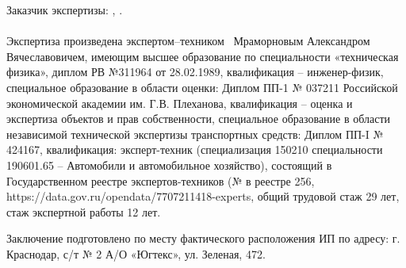 Заказчик  экспертизы:  ,  .



\paragraph*{}
Экспертиза произведена  экспертом--техником
\,  Мраморновым Александром Вячеславовичем, имеющим высшее  образование по специальности «техническая физика», диплом РВ №311964 от 28.02.1989, квалификация -- инженер-физик, специальное образование в области оценки: Диплом ПП-1 № 037211 Российской экономической академии им. Г.В. Плеханова, квалификация -- оценка и экспертиза объектов и прав собственности, специальное образование в области независимой технической экспертизы транспортных средств: Диплом ПП-I № 424167, квалификация: эксперт-техник (специализация 150210 специальности 190601.65 – Автомобили и автомобильное хозяйство), состоящий в Государственном реестре экспертов-техников (№ в реестре 256, https://data.gov.ru/opendata/7707211418-experts,  общий трудовой  стаж 29 лет, стаж  экспертной работы  12 лет. \par Заключение подготовлено по месту фактического расположения ИП по адресу: г. Краснодар, с/т № 2 А/О «Югтекс», ул. Зеленая, 472.

